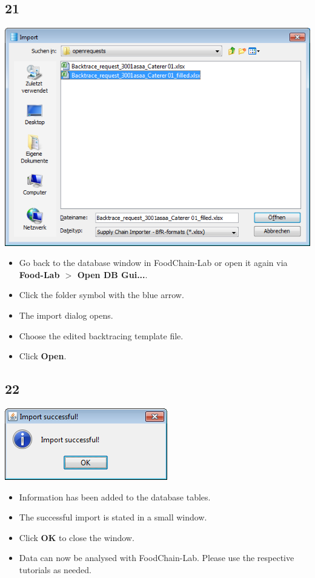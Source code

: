 \documentclass{beamer}
\begin{document}
\subsection{21}
\begin{frame}
	\begin{center}
  		\includegraphics[height=0.6\textheight]{21.png}
	\end{center}
	\begin{itemize}
		\item Go back to the database window in FoodChain-Lab or open it again via \textbf{Food-Lab $>$ Open DB Gui...}.
		\item Click the folder symbol with the blue arrow.
		\item The import dialog opens.
		\item Choose the edited backtracing template file.
		\item Click \textbf{Open}.
	\end{itemize}
\end{frame}

\subsection{22}
\begin{frame}
	\begin{center}
  		\includegraphics[height=0.3\textheight]{22.png}
	\end{center}
	\begin{itemize}
		\item Information has been added to the database tables.
		\item The successful import is stated in a small window.
		\item Click \textbf{OK} to close the window.
		\item Data can now be analysed with FoodChain-Lab. Please use the respective tutorials as needed.
	\end{itemize}
\end{frame}
\end{document}
